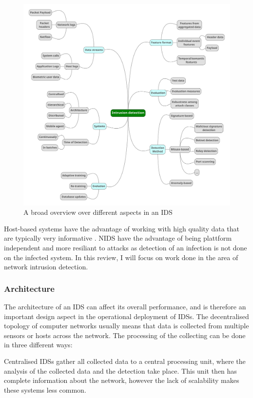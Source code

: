 \documentclass[a4paper,12pt,twoside]{report}
\begin{document}
\begin{figure}\label{graph}
\centering
\includegraphics[scale=0.25]{Graphic2.pdf}
\caption{A broad overview over different aspects in an IDS}
\end{figure}

Host-based systems have the advantage of working with high quality data that   are   typically   very   informative \cite{lazarevic2005intrusion}. NIDS have the advantage of being plattform independent and more resiliant to attacks as detection of an infection is not done on the infected system. In this review, I will focus on work done in the area of network intrusion detection.





\subsubsection*{Architecture}

The architecture of an IDS can affect its overall performance, and is therefore an important design aspect in the operational deployment of IDSs. The decentralised topology of computer networks usually means that data is collected from multiple sensors or hosts across the network. The processing of the collecting can be done in three different ways:

Centralised IDSs gather all collected data to a central processing unit,  where  the 
analysis of the collected data and the detection take place. This unit then has complete information about the network, however the lack of scalability makes these systems less common. 
\end{document}
